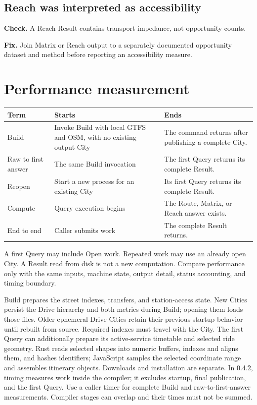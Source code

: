 \documentclass[10pt,letterpaper]{article}
\begin{document}
\subsection{Reach was interpreted as accessibility}

\textbf{Check.} A Reach Result contains transport impedance, not opportunity counts.

\textbf{Fix.} Join Matrix or Reach output to a separately documented opportunity dataset and method before reporting an accessibility measure.

\clearpage
\appendix

\section{Performance measurement}

\begin{center}
\begin{tabularx}{\linewidth}{P{1.05in} Y Y}
\toprule
\textbf{Term} & \textbf{Starts} & \textbf{Ends} \\
\midrule
Build & Invoke Build with local GTFS and OSM, with no existing output City & The command returns after publishing a complete City. \\
Raw to first answer & The same Build invocation & The first Query returns its complete Result. \\
Reopen & Start a new process for an existing City & Its first Query returns its complete Result. \\
Compute & Query execution begins & The Route, Matrix, or Reach answer exists. \\
End to end & Caller submits work & The complete Result returns. \\
\bottomrule
\end{tabularx}
\end{center}

A first Query may include Open work. Repeated work may use an already open City. A Result read from disk is not a new computation. Compare performance only with the same inputs, machine state, output detail, status accounting, and timing boundary.

Build prepares the street indexes, transfers, and station-access state. New Cities persist the Drive hierarchy and both metrics during Build; opening them loads those files. Older ephemeral Drive Cities retain their previous startup behavior until rebuilt from source. Required indexes must travel with the City. The first Query can additionally prepare its active-service timetable and selected ride geometry. Rust reads selected shapes into numeric buffers, indexes and aligns them, and hashes identifiers; JavaScript samples the selected coordinate range and assembles itinerary objects. Downloads and installation are separate. In 0.4.2,  timing  measures work inside the compiler; it excludes startup, final publication, and the first Query. Use a caller timer for complete Build and raw-to-first-answer measurements. Compiler stages can overlap and their times must not be summed.
\end{document}
